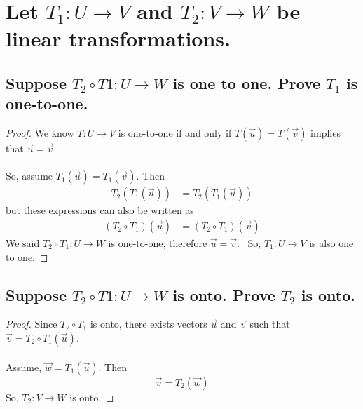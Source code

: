 \documentclass[../main.tex]{subfiles}
\begin{document}
\section[Problem 3]{Let $T_{1}:U\rightarrow V$ and $T_{2}:V\rightarrow W$ be linear transformations.}
\subsection{Suppose $T_{2}\circ T{1}:U\rightarrow W$ is one to one. Prove $T_{1}$ is one-to-one.}
\begin{proof}
        We know $\displaystyle T:U\rightarrow V$ is one-to-one if and only if $\displaystyle T(\vec{u}) =T(\vec{v})$ implies that $\displaystyle \vec{u} =\vec{v}$\\\\
        So, assume $\displaystyle T_{1}(\vec{u}) =T_{1}(\vec{v})$. Then
        \begin{align*}
                T_{2}( T_{1}(\vec{u})) & =T_{2}( T_{1}(\vec{u}))
        \end{align*}
        but these expressions can also be written as
        \begin{align*}
                ( T_{2} \circ T_{1})(\vec{u}) & =( T_{2} \circ T_{1})(\vec{v})
        \end{align*}
        We said $\displaystyle T_{2} \circ T_{1} :U\rightarrow W$ is one-to-one, therefore $\displaystyle \vec{u} =\vec{v}$. \ So, $\displaystyle T_{1} :U\rightarrow V$ is also one to one.
\end{proof}
\subsection{Suppose $T_{2}\circ T{1}:U\rightarrow W$ is onto. Prove $T_{2}$ is onto.}
\begin{proof}
        Since $\displaystyle T_{2} \circ T_{1}$ is onto, there exists vectors $\displaystyle \vec{u}$ and $\displaystyle \vec{v}$ such that $\displaystyle \vec{v} =T_{2} \circ T_{1}(\vec{u})$.\\\\
        Assume, $\displaystyle \vec{w} =T_{1}(\vec{u})$. Then
        \begin{equation*}
                \vec{v} =T_{2}(\vec{w})
        \end{equation*}So, $\displaystyle T_{2} :V\rightarrow W$ is onto.
\end{proof}
\end{document}
